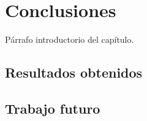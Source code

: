 
\chapter{Conclusiones} %

\label{Chapter5} %




Párrafo introductorio del capítulo.

\section{Resultados obtenidos}

\section{Trabajo futuro}